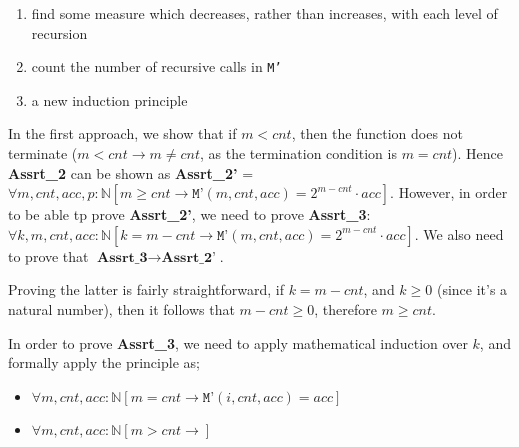\documentclass[a4paper, 12pt]{article}
\begin{document}
            \begin{enumerate}[1.]
                \itemsep0em
                \item find some measure which decreases, rather than increases, with each level of recursion
                \item count the number of recursive calls in \texttt{M'}
                \item a new induction principle
            \end{enumerate}
            In the first approach, we show that if $m < cnt$, then the function does not terminate ($m < cnt \rightarrow m \neq cnt$, as the termination condition is $m = cnt$). Hence \textbf{Assrt\_2} can be shown as \textbf{Assrt\_2'} = $\forall m, cnt, acc, p : \mathbb{N} [m \geq cnt \rightarrow \texttt{M'}(m, cnt, acc) = 2^{m - cnt} \cdot acc]$. However, in order to be able tp prove \textbf{Assrt\_2'}, we need to prove \textbf{Assrt\_3}: $\forall k, m, cnt, acc : \mathbb{N} [k = m - cnt \rightarrow \texttt{M'}(m, cnt, acc) = 2^{m - cnt} \cdot acc]$. We also need to prove that $\textbf{Assrt\_3} \rightarrow \textbf{Assrt\_2'}$.
            \medskip

            Proving the latter is fairly straightforward, if $k = m - cnt$, and $k \geq 0$ (since it's a natural number), then it follows that $m - cnt \geq 0$, therefore $m \geq cnt$.
            \medskip

            In order to prove \textbf{Assrt\_3}, we need to apply mathematical induction over $k$, and formally apply the principle as;
            \smallskip

            \begin{itemize}
                \itemsep0em
                \item $\forall m, cnt, acc : \mathbb{N} [m = cnt \rightarrow \texttt{M'}(i, cnt, acc) = acc]$
                \item $\forall m, cnt, acc : \mathbb{N} [m > cnt \rightarrow ]$
            \end{itemize}
\end{document}
